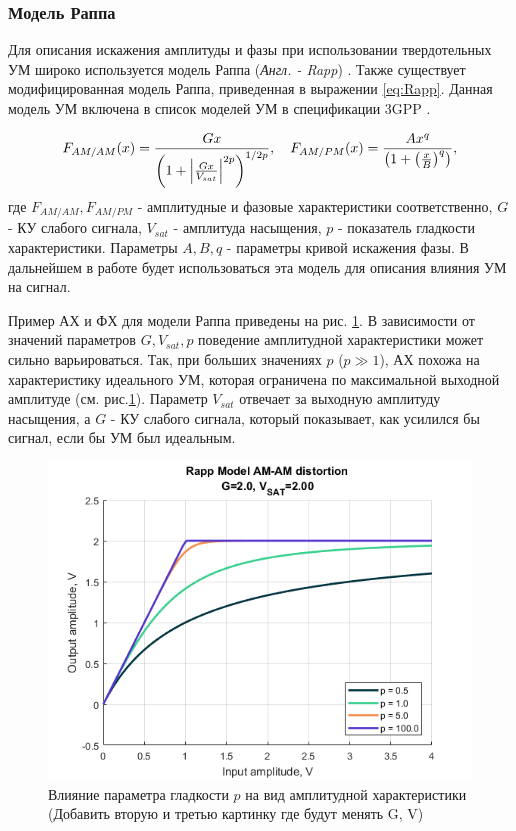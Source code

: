\subsubsection{Модель Раппа}
Для описания искажения амплитуды и фазы при использовании твердотельных УМ
широко используется модель Раппа (\textit{Англ. - Rapp}) \cite{Rapp1991}.
Также существует модифицированная модель Раппа, приведенная в выражении
\ref{eq:Rapp}. Данная модель УМ включена в список моделей УМ в спецификации
3GPP \cite{3gpp.38.803}.

\begin{equation}
    F_{AM/AM}(x) = \frac{G x}{\left( 1 + \abs{\frac{Gx}{V_{sat}}}^{2p}\right)^{1/2p}},
    \quad 
    F_{AM/PM}(x) = \frac{Ax^q}{\left(1+\left(\frac{x}{B}\right)^q\right)},
    \label{eq:Rapp}
\end{equation}
где $F_{AM/AM}, F_{AM/PM}$ - амплитудные и фазовые характеристики
соответственно, $G$ - КУ слабого сигнала, $V_{sat}$ - амплитуда насыщения,
$p$ - показатель гладкости характеристики. Параметры $A,B,q$ - параметры
кривой искажения фазы. В дальнейшем в работе будет использоваться эта
модель для описания влияния УМ на сигнал.

Пример АХ и ФХ для модели Раппа приведены на  рис. \ref{fig:rapp_p_parameters}.
В зависимости от значений параметров $G, V_{sat}, p$ поведение амплитудной
характеристики может сильно варьироваться. Так, при больших значениях $p$
($p\gg 1$), АХ похожа на характеристику идеального УМ, которая ограничена
по максимальной выходной амплитуде (см. рис.\ref{fig:rapp_p_parameters}).
Параметр $V_{sat}$ отвечает за выходную амплитуду насыщения, а $G$ - КУ
слабого сигнала, который показывает, как усилился бы сигнал, если бы УМ был 
идеальным.
\begin{figure}[h!]
    \centering
    \includegraphics[width=0.7\linewidth]{figs/rapp_p.png}
    \caption{Влияние параметра гладкости $p$ на вид амплитудной
    характеристики (Добавить вторую и третью картинку где будут менять G, V)}
    \label{fig:rapp_p_parameters}
\end{figure}

